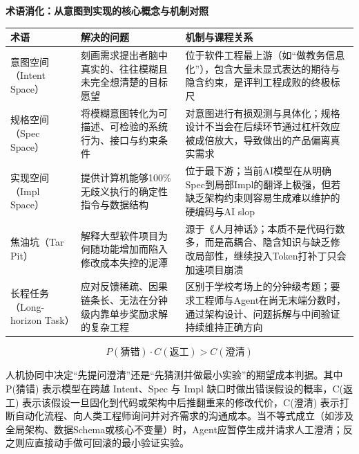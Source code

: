 \documentclass[UTF8,a4paper,11pt,fontset=fandol]{ctexart}
\begin{document}
\par{}\textbf{术语消化：从意图到实现的核心概念与机制对照}

\begin{center}\small\begin{tabularx}{\linewidth}{YYY}

\toprule

术语 & 解决的问题 & 机制与课程关系\\\midrule

意图空间（Intent Space） & 刻画需求提出者脑中真实的、往往模糊且未完全想清楚的目标愿望 & 位于软件工程最上游（如“做教务信息化”），包含大量未显式表达的期待与隐含约束，是评判工程成败的终极标尺\\[3pt]

规格空间（Spec Space） & 将模糊意图转化为可描述、可检验的系统行为、接口与约束条件 & 对意图进行有损观测与具体化；规格设计不当会在后续环节通过杠杆效应被成倍放大，导致做出的产品偏离真实需求\\[3pt]

实现空间（Impl Space） & 提供计算机能够100\%无歧义执行的确定性指令与数据结构 & 位于最下游；当前AI模型在从明确Spec到局部Impl的翻译上极强，但若缺乏架构约束则容易生成难以维护的硬编码与AI slop\\[3pt]

焦油坑（Tar Pit） & 解释大型软件项目为何随功能增加而陷入修改成本失控的泥潭 & 源于《人月神话》；本质不是代码行数多，而是高耦合、隐含知识与缺乏修改局部性，继续投入Token打补丁只会加速项目崩溃\\[3pt]

长程任务（Long-horizon Task） & 应对反馈稀疏、因果链条长、无法在分钟级内靠单步奖励求解的复杂工程 & 区别于学校考场上的分钟级考题；要求工程师与Agent在尚无末端分数时，通过架构设计、问题拆解与中间验证持续维持正确方向\\[3pt]

\bottomrule\end{tabularx}\end{center}

\[
P(\text{猜错}) \cdot C(\text{返工}) > C(\text{澄清})
\]

人机协同中决定“先提问澄清”还是“先猜测并做最小实验”的期望成本判据。其中 P(猜错) 表示模型在跨越 Intent、Spec 与 Impl 缺口时做出错误假设的概率，C(返工) 表示该假设一旦固化到代码或架构中后推翻重来的修改代价，C(澄清) 表示打断自动化流程、向人类工程师询问并对齐需求的沟通成本。当不等式成立（如涉及全局架构、数据Schema或核心不变量）时，Agent应暂停生成并请求人工澄清；反之则应直接动手做可回滚的最小验证实验。
\end{document}
